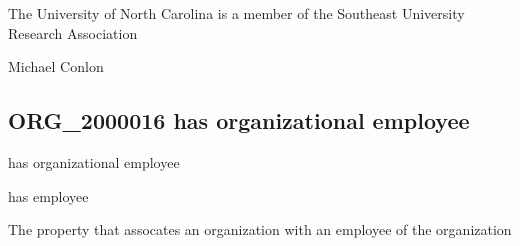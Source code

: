 \documentclass[letterpaper,10pt,english]{sphinxmanual}
\begin{document}
\begin{sphinxShadowBox}

\sphinxAtStartPar
The University of North Carolina is a member of the Southeast University Research Association
\end{sphinxShadowBox}

\begin{sphinxShadowBox}

\sphinxAtStartPar
Michael Conlon 
\end{sphinxShadowBox}
\begin{quote}

\ignorespaces \end{quote}


\subsection{ORG\_2000016 \sphinxhyphen{} has organizational employee}
\label{\detokenize{doc-ORG_2000016:org-2000016-has-organizational-employee}}\label{\detokenize{doc-ORG_2000016:index-0}}\label{\detokenize{doc-ORG_2000016::doc}}
\begin{sphinxShadowBox}

\sphinxAtStartPar
has organizational employee
\end{sphinxShadowBox}

\begin{sphinxShadowBox}

\sphinxAtStartPar
has employee
\end{sphinxShadowBox}

\begin{sphinxShadowBox}

\sphinxAtStartPar
{}
\end{sphinxShadowBox}

\begin{sphinxShadowBox}

\sphinxAtStartPar
The property that assocates an organization with an employee of the organization
\end{sphinxShadowBox}
\end{document}
